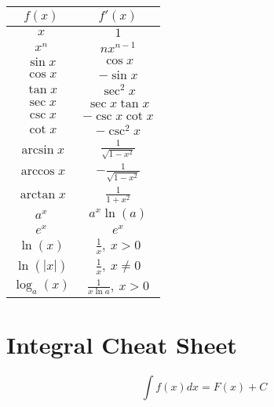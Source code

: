 \documentclass[8pt,a4paper,twocolumn,table]{extarticle}
\begin{document}
\begin{tabular}{|c | c |}
    \hline
    \rowcolor{lightgray} $f(x)$ & $f'(x)$                       \\
    \hline
    $x$                         & $1$                           \\
    \hline
    $x^n$                       & $nx^{n-1}$                    \\
    \hline
    $\sin x$                    & $\cos x$                      \\
    \hline
    $ \cos x $                  & $ -\sin x $                   \\
    \hline
    $ \tan x $                  & $ \sec^2 x $                  \\
    \hline
    $ \sec x $                  & $ \sec x \tan x $             \\
    \hline
    $ \csc x $                  & $ -\csc x \cot x$             \\
    \hline
    $ \cot x $                  & $ -\csc^2 x $                 \\
    \hline
    $ \arcsin x$                & $ \frac{1}{\sqrt{1 - x^2}} $  \\
    \hline
    $ \arccos x$                & $ -\frac{1}{\sqrt{1 - x^2}} $ \\
    \hline
    $ \arctan x$                & $ \frac{1}{1 + x^2} $         \\
    \hline
    $ a^x $                     & $ a^x \ln(a) $                \\
    \hline
    $ e^x $                     & $ e^x $                       \\
    \hline
    $ \ln(x) $                  & $ \frac{1}{x},\ x > 0 $       \\
    \hline
    $ \ln(|x|) $                & $ \frac{1}{x},\ x \ne 0 $     \\
    \hline
    $ \log_a(x) $               & $ \frac{1}{x \ln a},\ x > 0 $ \\
\end{tabular}

\section{Integral Cheat Sheet}

\[ \int f(x)dx = F(x) + C \]
\end{document}
